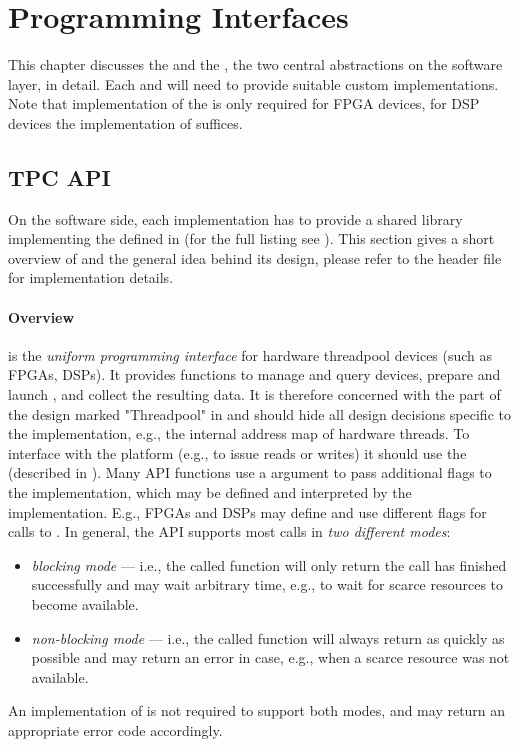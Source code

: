 \section{Programming Interfaces}\label{sec:apis}%
This chapter discusses the  and the , the two central abstractions on the software layer, in detail.
Each  and  will need to provide suitable custom implementations.
Note that implementation of the  is only required for FPGA devices, for DSP devices the implementation of  suffices.

\subsection{TPC API}\label{sec:ai-tpcapi}%
On the software side, each  implementation has to provide a shared library implementing the  defined in  (for the full listing see ).
This section gives a short overview of  and the general idea behind its design, please refer to the header file for implementation details.

\paragraph{Overview}
 is the \emph{uniform programming interface} for hardware threadpool devices (such as FPGAs, DSPs).
It provides functions to manage and query devices, prepare and launch , and collect the resulting data.
It is therefore concerned with the part of the design marked "Threadpool" in  and should hide all design decisions specific to the  implementation, e.g., the internal address map of hardware threads.
To interface with the platform (e.g., to issue reads or writes) it should use the  (described in ).
Many API functions use a  argument to pass additional flags to the implementation, which may be defined and interpreted by the implementation.
E.g., FPGAs and DSPs may define and use different flags for calls to .
In general, the API supports most calls in \emph{two different modes}:
%
\begin{itemize}
  \item \emph{blocking mode} ---  i.e., the called function will only return the call has finished successfully and may wait arbitrary time, e.g., to wait for scarce resources to become available.
  \item \emph{non-blocking mode} --- i.e., the called function will always return as quickly as possible and may return an error in case, e.g., when a scarce resource was not available.
\end{itemize}
%
An implementation of  is not required to support both modes, and may return an appropriate error code accordingly.
